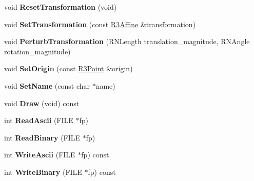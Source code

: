 \begin{DoxyCompactItemize}
\item 
void {\bfseries Reset\+Transformation} (void)\hypertarget{struct_f_e_t_shape_afab2b6856fa49c48de4dfc746b5abdb7}{}\label{struct_f_e_t_shape_afab2b6856fa49c48de4dfc746b5abdb7}

\item 
void {\bfseries Set\+Transformation} (const \hyperlink{class_r3_affine}{R3\+Affine} \&transformation)\hypertarget{struct_f_e_t_shape_a34c927c78c927a548a79a71efc87740b}{}\label{struct_f_e_t_shape_a34c927c78c927a548a79a71efc87740b}

\item 
void {\bfseries Perturb\+Transformation} (R\+N\+Length translation\+\_\+magnitude, R\+N\+Angle rotation\+\_\+magnitude)\hypertarget{struct_f_e_t_shape_ab29c32cd42e3d08a80d576289840e213}{}\label{struct_f_e_t_shape_ab29c32cd42e3d08a80d576289840e213}

\item 
void {\bfseries Set\+Origin} (const \hyperlink{class_r3_point}{R3\+Point} \&origin)\hypertarget{struct_f_e_t_shape_a54c6f8cb9a13fbd9578b528937b46998}{}\label{struct_f_e_t_shape_a54c6f8cb9a13fbd9578b528937b46998}

\item 
void {\bfseries Set\+Name} (const char $\ast$name)\hypertarget{struct_f_e_t_shape_a28230a8f60f5d95179cfee56bdb2153f}{}\label{struct_f_e_t_shape_a28230a8f60f5d95179cfee56bdb2153f}

\item 
void {\bfseries Draw} (void) const \hypertarget{struct_f_e_t_shape_a27f160167caf81ef3a574881bc3496b0}{}\label{struct_f_e_t_shape_a27f160167caf81ef3a574881bc3496b0}

\item 
int {\bfseries Read\+Ascii} (F\+I\+LE $\ast$fp)\hypertarget{struct_f_e_t_shape_ac2831888e4bb8c98b57e881e534f416b}{}\label{struct_f_e_t_shape_ac2831888e4bb8c98b57e881e534f416b}

\item 
int {\bfseries Read\+Binary} (F\+I\+LE $\ast$fp)\hypertarget{struct_f_e_t_shape_a570248d87c174d3ab5303e60e7f91850}{}\label{struct_f_e_t_shape_a570248d87c174d3ab5303e60e7f91850}

\item 
int {\bfseries Write\+Ascii} (F\+I\+LE $\ast$fp) const \hypertarget{struct_f_e_t_shape_afcb55b0ce620bea5dcd133194f280be8}{}\label{struct_f_e_t_shape_afcb55b0ce620bea5dcd133194f280be8}

\item 
int {\bfseries Write\+Binary} (F\+I\+LE $\ast$fp) const \hypertarget{struct_f_e_t_shape_a2c3eb3c7afb546123fb17c6c057bab76}{}\label{struct_f_e_t_shape_a2c3eb3c7afb546123fb17c6c057bab76}


\end{DoxyCompactItemize}
